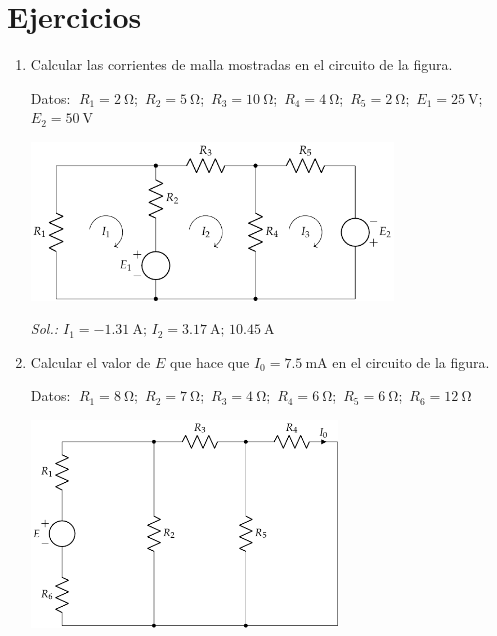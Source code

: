 \section*{Ejercicios}

\begin{enumerate}
\item Calcular las corrientes de malla mostradas en el circuito de la
  figura.
  
  Datos: $\; R_1 = \qty{2}{\ohm}$;\, $R_2 = \qty{5}{\ohm}$;\, $R_3 = \qty{10}{\ohm}$;\, $R_4 = \qty{4}{\ohm}$;\, $R_5 = \qty{2}{\ohm}$;\, $E_1 = \qty{25}{\volt}$;\, $E_2 = \qty{50}{\volt}$

  \begin{center}
    \includegraphics[height=4.2cm]{../figs/ej2_BT1.pdf}
  \end{center}

  \emph{Sol.:\; $I_1=\qty{-1.31}{\ampere};\, I_2=\qty{3.17}{\ampere};\, \qty{10.45}{\ampere}$}
	
	
\item Calcular el valor de $E$ que hace que $I_0=\qty{7.5}{\milli\ampere}$ en el
  circuito de la figura.

  Datos: $\; R_1 = \qty{8}{\ohm}$;\, $R_2 = \qty{7}{\ohm}$;\, $R_3 = \qty{4}{\ohm}$;\, $R_4 = \qty{6}{\ohm}$;\, $R_5 = \qty{6}{\ohm}$;\, $R_6 = \qty{12}{\ohm}$ 
  
  \begin{center}
    \includegraphics[height=5.5cm]{../figs/ej3_BT1.pdf}
  \end{center}
  

\end{enumerate}
